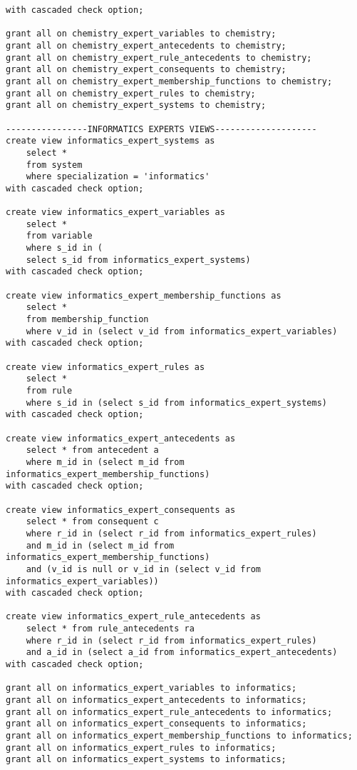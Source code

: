 \begin{lstlisting}[caption=Создание ролей на уровне базы данных (часть 3)]
with cascaded check option;

grant all on chemistry_expert_variables to chemistry;
grant all on chemistry_expert_antecedents to chemistry;
grant all on chemistry_expert_rule_antecedents to chemistry;
grant all on chemistry_expert_consequents to chemistry;
grant all on chemistry_expert_membership_functions to chemistry;
grant all on chemistry_expert_rules to chemistry;
grant all on chemistry_expert_systems to chemistry;

----------------INFORMATICS EXPERTS VIEWS--------------------
create view informatics_expert_systems as 
	select * 
	from system 
	where specialization = 'informatics' 
with cascaded check option;

create view informatics_expert_variables as 
	select * 
	from variable 
	where s_id in (
	select s_id from informatics_expert_systems)
with cascaded check option;

create view informatics_expert_membership_functions as
	select * 
	from membership_function
	where v_id in (select v_id from informatics_expert_variables)
with cascaded check option;

create view informatics_expert_rules as
	select *
	from rule
	where s_id in (select s_id from informatics_expert_systems)
with cascaded check option;

create view informatics_expert_antecedents as
	select * from antecedent a 
	where m_id in (select m_id from informatics_expert_membership_functions)
with cascaded check option;

create view informatics_expert_consequents as
	select * from consequent c 
	where r_id in (select r_id from informatics_expert_rules) 
	and m_id in (select m_id from informatics_expert_membership_functions)
	and (v_id is null or v_id in (select v_id from informatics_expert_variables))
with cascaded check option;

create view informatics_expert_rule_antecedents as
	select * from rule_antecedents ra 
	where r_id in (select r_id from informatics_expert_rules)
	and a_id in (select a_id from informatics_expert_antecedents)
with cascaded check option;

grant all on informatics_expert_variables to informatics;
grant all on informatics_expert_antecedents to informatics;
grant all on informatics_expert_rule_antecedents to informatics;
grant all on informatics_expert_consequents to informatics;
grant all on informatics_expert_membership_functions to informatics;
grant all on informatics_expert_rules to informatics;
grant all on informatics_expert_systems to informatics;
\end{lstlisting}
\pagebreak
